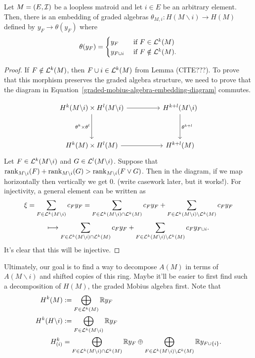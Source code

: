 \documentclass{puthesis-UG}
\begin{document}
\begin{thm}
	Let $M = (E, \mathcal{I})$ be a loopless matroid and let $i \in E$ be an arbitrary element. Then, there is an embedding of graded algebras $\theta_{M, i} : H(M \backslash i) \to H(M)$ defined by $y_F \to \theta(y_F)$ where
	\[
		\theta(y_F) = \begin{cases}
			y_F & \text{ if $F \in \mathcal{L}^k(M)$} \\
			y_{F \cup i} & \text{ if $F \notin \mathcal{L}^k(M)$}.
		\end{cases}
	\]
\end{thm} 
\begin{proof}
	If $F \notin \mathcal{L}^k(M)$, then $F \cup i \in \mathcal{L}^k(M)$ from Lemma (CITE???). To prove that this morphism preserves the graded algebra structure, we need to prove that the diagram in Equation~\ref{graded-mobius-algebra-embedding-diagram} commutes. 

	\begin{equation} \label{graded-mobius-algebra-embedding-diagram}
		\begin{tikzcd}
	{H^k(M \backslash i) \times H^l(M \backslash i)} && {H^{k+l}(M\backslash i)} \\
	\\
	{H^k(M) \times H^l(M)} && {H^{k+l}(M)}
	\arrow[from=1-1, to=1-3]
	\arrow["{\theta^k \times \theta^l}"', from=1-1, to=3-1]
	\arrow[from=3-1, to=3-3]
	\arrow["{\theta^{k+l}}", from=1-3, to=3-3]
\end{tikzcd}
	\end{equation}
	Let $F \in \mathcal{L}^k(M \backslash i)$ and $G \in \mathcal{L}^l (M \backslash i)$. Suppose that $\operatorname{rank}_{M \backslash i} (F) + \operatorname{rank}_{M \backslash i}(G) > \operatorname{rank}_{M \backslash i} (F \vee G)$. Then in the diagram, if we map horizontally then vertically we get $0$. (write casework later, but it works!). For injectivity, a general element can be written as 
	\[
		\xi = \sum_{F \in \mathcal{L}^k (M \backslash i)} c_F y_F = \sum_{F \in \mathcal{L}^k(M \backslash i) \cap \mathcal{L}^k(M)}c_F y_F + \sum_{F \in \mathcal{L}^k(M \backslash i) \backslash \mathcal{L}^k(M)} c_F y_F 
	\]
	\[
		\longmapsto \sum_{F \in \mathcal{L}^k(M \backslash i) \cap \mathcal{L}^k(M)} c_F y_F + \sum_{F \in \mathcal{L}^k(M \backslash i) \backslash \mathcal{L}^k(M)} c_F y_{F \cup i}. 
	\]
	It's clear that this will be injective. 
\end{proof}

Ultimately, our goal is to find a way to decompose $A(M)$ in terms of $A(M \backslash i)$ and shifted copies of this ring. Maybe it'll be easier to first find such a decomposition of $H(M)$, the graded Mobius algebra first. Note that
\begin{align*}
	H^k(M) & := \bigoplus_{F \in \mathcal{L}^k(M)} \mathbb{R} y_F \\
	H^k(H \backslash i) & := \bigoplus_{F \in \mathcal{L}^k(M \backslash i)} \mathbb{R} y_F \\
	H^k_{(i)} & = \bigoplus_{F \in \mathcal{L}^k(M \backslash i) \cap \mathcal{L}^k(M)} \mathbb{R} y_F \oplus \bigoplus_{F \in \mathcal{L}^k(M \backslash i) \backslash \mathcal{L}^k(M)} \mathbb{R} y_{F \cup \{i\}}.
\end{align*}
\end{document}

